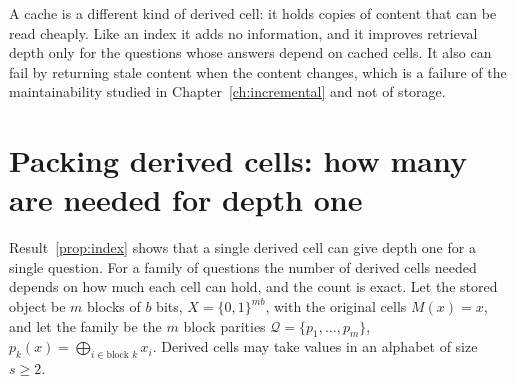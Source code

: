 \begin{remark}
A cache is a different kind of derived cell: it holds copies of content that can be read cheaply. Like an index it adds no information, and it improves retrieval depth only for the questions whose answers depend on cached cells. It also can fail by returning stale content when the content changes, which is a failure of the maintainability studied in Chapter~\ref{ch:incremental} and not of storage.
\end{remark}


\section{Packing derived cells: how many are needed for depth one}\label{sec:packing}

Result~\ref{prop:index} shows that a single derived cell can give depth one for a single question. For a family of questions the number of derived cells needed depends on how much each cell can hold, and the count is exact. Let the stored object be $m$ blocks of $b$ bits, $X=\{0,1\}^{mb}$, with the original cells $M(x)=x$, and let the family be the $m$ block parities $\mathcal Q=\{p_1,\dots,p_m\}$, $p_k(x)=\bigoplus_{i\in\text{block }k}x_i$. Derived cells may take values in an alphabet of size $s\ge2$.


